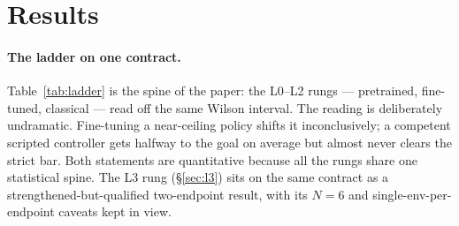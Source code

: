 \documentclass[10pt]{article}
\begin{document}

\section{Results}
\label{sec:results}

\paragraph{The ladder on one contract.}
Table~\ref{tab:ladder} is the spine of the paper: the L0--L2
rungs --- pretrained, fine-tuned, classical --- read off the same Wilson
interval. The reading is deliberately undramatic. Fine-tuning a
near-ceiling policy shifts it inconclusively; a competent scripted
controller gets halfway to the goal on average but almost never clears
the strict bar. Both statements are quantitative because all the rungs
share one statistical spine. The L3 rung (\S\ref{sec:l3}) sits on the
same contract as a strengthened-but-qualified two-endpoint result, with
its $N{=}6$ and single-env-per-endpoint caveats kept in view.
\end{document}
